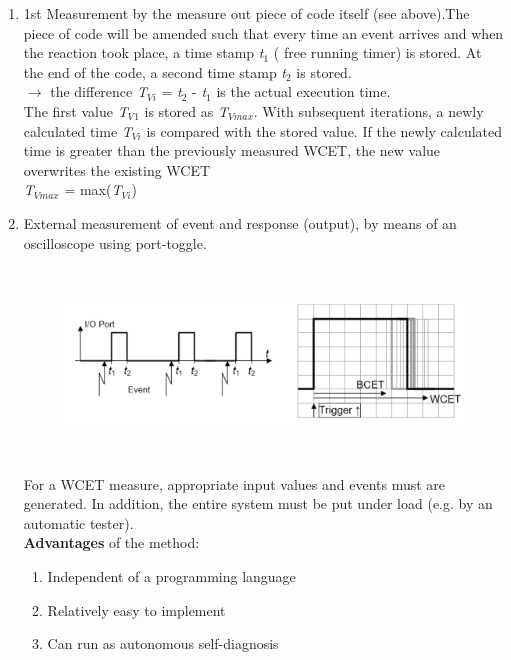 \begin{enumerate}
\item  1st Measurement by the measure out piece of code itself (see above).The piece of code will be amended such that every time an event arrives and when the reaction took place, a time stamp\textit{ t}${}_{1}$ ( free running timer) is stored. At the end of the code, a second time stamp\textit{ t}${}_{2}$ is stored.\\
$\rightarrow$ the difference \textit{T${}_{Vi}$} = \textit{t}${}_{2}$ - \textit{t}${}_{1}$ is the actual execution time.\\
	
The first value \textit{T${}_{V}$}${}_{1}$ is stored as \textit{T${}_{Vmax}$}. With subsequent iterations, a newly calculated time \textit{T${}_{Vi}$}  is compared with the stored value. If the newly calculated time is greater than the previously measured WCET, the new value overwrites the existing WCET\\
	
\textit{T${}_{Vmax}$} = max(\textit{T${}_{Vi}$})

\item External measurement of event and response (output), by means of an oscilloscope using port-toggle.

	\begin{figure}[h]
    \centering
    \includegraphics[width=15cm, height=5cm]{Images/image77.png}
    \label{fig:Fig 23}
    \end{figure}
    
For a WCET measure, appropriate input values and events must are generated. In addition, the entire system must be put under load (e.g. by an automatic tester).\\

\textbf{Advantages} of the method:

\begin{enumerate}
	\item  Independent of a programming language
	\item  Relatively easy to implement
	\item  Can run as autonomous self-diagnosis
\end{enumerate}


\end{enumerate}
